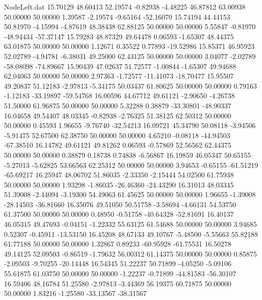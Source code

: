 \begin{filecontents}{NodeLeft.dat}
  15.70129   48.60413   52.19574    -0.82938   -4.48225   46.87812   63.00938   50.00000   50.00000    1.39587   -2.19574   -9.65164  -52.16070
  15.74194   44.44153   50.81970    -4.15994   -4.87619   48.38438   62.88125   50.00000   50.00000    5.55847   -0.81970  -48.94434  -57.37147
  15.79283   48.87329   49.64478     0.06593   -1.65307   48.44375   63.01875   50.00000   50.00000    1.12671    0.35522    0.77893  -19.52986
  15.85371   46.95923   52.02789    -4.94781   -6.38031   49.25000   62.43125   50.00000   50.00000    3.04077   -2.02789  -58.08098  -74.89667
  15.90439   47.02637   51.72577    -1.00844   -1.65307   49.94688   62.04063   50.00000   50.00000    2.97363   -1.72577  -11.41073  -18.70477
  15.95507   49.20837   51.12183    -2.97813   -5.34175   50.03437   61.80625   50.00000   50.00000    0.79163   -1.12183  -33.19897  -59.54768
  16.00596   44.67712   49.61121    -2.90650   -4.26738   51.50000   61.96875   50.00000   50.00000    5.32288    0.38879  -33.30801  -48.90337
  16.04658   49.54407   48.03345    -0.82938   -2.76325   51.38125   62.50312   50.00000   50.00000    0.45593    1.96655   -9.76740  -32.54213
  16.09721   45.34790   50.08118    -3.94506   -5.91475   52.67500   62.38750   50.00000   50.00000    4.65210   -0.08118  -44.94503  -67.38510
  16.14782   49.61121   49.81262     0.06593   -0.57869   52.56562   62.44375   50.00000   50.00000    0.38879    0.18738    0.74838   -6.56867
  16.19859   46.05347   50.65155    -5.27013   -5.62825   53.66563   62.25312   50.00000   50.00000    3.94653   -0.65155  -61.51219  -65.69217
  16.25947   48.06702   51.86035    -2.33350   -2.15444   54.02500   61.75938   50.00000   50.00000    1.93298   -1.86035  -26.46360  -24.43290
  16.31013   48.03345   51.39008    -2.44094   -3.19300   54.49063   61.45625   50.00000   50.00000    1.96655   -1.39008  -28.14503  -36.81660
  16.35076   49.51050   50.51758    -3.58694   -4.66131   54.53750   61.37500   50.00000   50.00000    0.48950   -0.51758  -40.64328  -52.81691
  16.40137   46.05315   49.47693    -0.04151   -1.22332   55.63125   61.54688   50.00000   50.00000    3.94685    0.52307   -0.45911  -13.53150
  16.45208   48.67133   49.10767    -5.48500   -5.55663   55.82188   61.77188   50.00000   50.00000    1.32867    0.89233  -60.95928  -61.75531
  16.50278   49.14125   52.09503    -0.86519   -1.79632   56.00312   61.14375   50.00000   50.00000    0.85875   -2.09503   -9.70255  -20.14448
  16.54345   51.22237   50.71899    -4.05250   -5.09106   55.61875   61.03750   50.00000   50.00000   -1.22237   -0.71899  -44.81583  -56.30107
  16.59406   48.16784   51.25580    -2.97813   -3.44369   56.19375   60.71875   50.00000   50.00000    1.83216   -1.25580  -33.13567  -38.31567

\end{filecontents}
